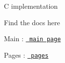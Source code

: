 C implementation

Find the docs here


\begin{DoxyEnumerate}
\item Main \+: \href{./docs/html/index.html}{\texttt{ main page}}
\item Pages \+: \href{./docs/html/pages.html}{\texttt{ pages}} 
\end{DoxyEnumerate}